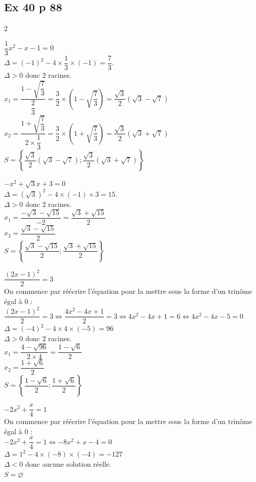\documentclass[12pt,a4paper]{book}
\begin{document}
\subsection*{Ex 40 p 88}
\begin{multicols}{2}
\begin{enumMet}
    \item $\dfrac{1}{3} x^{2}-x-1=0$\\
    $\Delta=(-1)^{2}-4 \times \dfrac{1}{3} \times(-1)=\dfrac{7}{3}$.\\
    $\Delta>0$ donc 2 racines.\\
    $x_{1}=\dfrac{1-\sqrt{\dfrac{7}{3}}}{\dfrac{2}{3}}=\dfrac{3}{2} \times\left(1-\sqrt{\dfrac{7}{3}}\right)=\dfrac{\sqrt{3}}{2}(\sqrt{3}-\sqrt{7})$\\
    $x_{2}=\dfrac{1+\sqrt{\dfrac{7}{3}}}{2 \times \dfrac{1}{3}}=\dfrac{3}{2} \times\left(1+\sqrt{\dfrac{7}{3}}\right)=\dfrac{\sqrt{3}}{2}(\sqrt{3}+\sqrt{7})$\\
    $S=\left\{\dfrac{\sqrt{3}}{2}(\sqrt{3}-\sqrt{7});\dfrac{\sqrt{3}}{2}(\sqrt{3}+\sqrt{7})\right\}$\\
    \item $-x^{2}+\sqrt{3} x+3=0$\\
    $\Delta=(\sqrt{3})^{2}-4 \times(-1) \times 3=15$.\\
    $\Delta>0$ donc 2 racines.\\
    $x_{1}=\dfrac{-\sqrt{3}-\sqrt{15}}{-2}=\dfrac{\sqrt{3}+\sqrt{15}}{2}$\\
    $x_{2}=\dfrac{\sqrt{3}-\sqrt{15}}{2}$\\
    $S=\left\{\dfrac{\sqrt{3}-\sqrt{15}}{2};\dfrac{\sqrt{3}+\sqrt{15}}{2}\right\}$
    
    \columnbreak
    \item $\dfrac{(2 x-1)^{2}}{2}=3$\\
    On commence par réécrire l'équation pour la mettre sous la forme d'un trinôme égal à 0 : \\
    $\dfrac{(2 x-1)^{2}}{2}=3 \Leftrightarrow \dfrac{4 x^{2}-4 x+1}{2}=3 \Leftrightarrow 4 x^{2}-4 x+1=6 \Leftrightarrow 4 x^{2}-4 x-5=0$
    $\Delta=(-4)^{2}-4 \times 4 \times(-5)=96$\\
    $\Delta>0$ donc 2 racines.\\
    $x_{1}=\dfrac{4-\sqrt{96}}{2 \times 4}=\dfrac{1-\sqrt{6}}{2}$\\
    $x_{2}=\dfrac{1+\sqrt{6}}{2}$\\
    $S=\left\{\dfrac{1-\sqrt{6}}{2};\dfrac{1+\sqrt{6}}{2}\right\}$
    \item $-2 x^{2}+\dfrac{x}{4}=1$\\
    On commence par réécrire l'équation pour la mettre sous la forme d'un trinôme égal à 0 : \\
    $-2 x^{2}+\dfrac{x}{4}=1 \Leftrightarrow-8 x^{2}+x-4=0$\\
    $\Delta=1^{2}-4 \times(-8) \times(-4)=-127$\\
    $\Delta<0$ donc aucune solution réelle.\\
    $S=\varnothing$
\end{enumMet}
\end{multicols}
\end{document}

